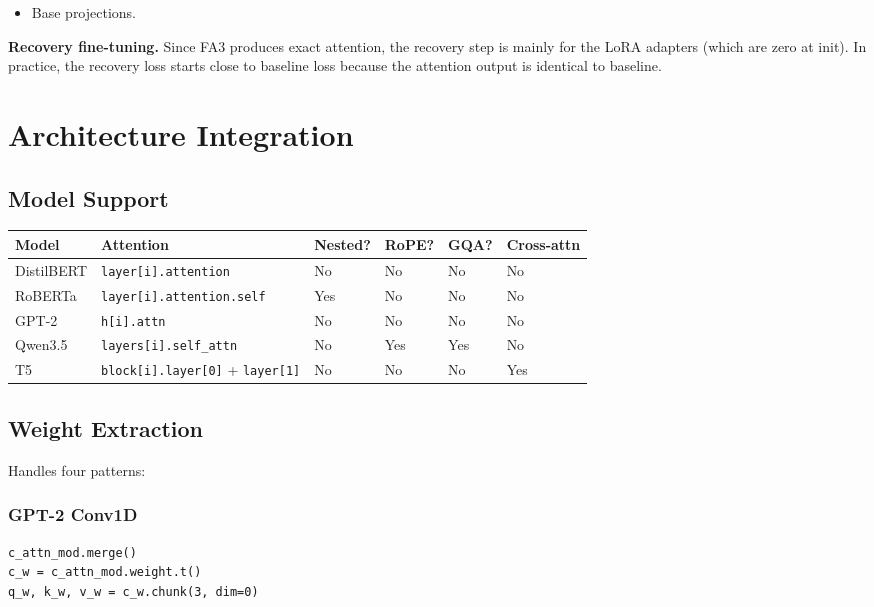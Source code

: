\begin{itemize}
\item Base projections.

\end{itemize}
\textbf{Recovery fine-tuning.} Since FA3 produces exact attention, the 
recovery step is mainly for the LoRA adapters (which are zero at init). In 
practice, the recovery loss starts close to baseline loss because the 
attention output is identical to baseline.



\section{Architecture Integration}

\subsection{Model Support}

\begin{table}[H]
\centering
\small
\begin{tabular}{llllll}
\toprule
\textbf{Model} & \textbf{Attention} & \textbf{Nested?} & \textbf{RoPE?} & \textbf{GQA?} & \textbf{Cross-attn} \\
\midrule
DistilBERT & \texttt{layer[i].attention} & No & No & No & No \\
RoBERTa & \texttt{layer[i].attention.self} & Yes & No & No & No \\
GPT-2 & \texttt{h[i].attn} & No & No & No & No \\
Qwen3.5 & \texttt{layers[i].self\_attn} & No & Yes & Yes & No \\
T5 & \texttt{block[i].layer[0]} + \texttt{layer[1]} & No & No & No & Yes \\
\bottomrule
\end{tabular}
\end{table}

\subsection{Weight Extraction}

Handles four patterns:

\subsubsection{GPT-2 Conv1D}

\begin{lstlisting}
c_attn_mod.merge()
c_w = c_attn_mod.weight.t()
q_w, k_w, v_w = c_w.chunk(3, dim=0)
\end{lstlisting}

